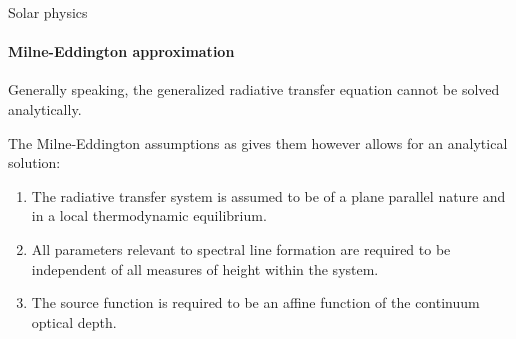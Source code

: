 \documentclass{beamer}
\begin{document}
%
%
%
%

\begin{frame}[allowframebreaks]{Solar physics}
\framesubtitle{Milne-Eddington approximation}
Generally speaking, the generalized radiative transfer equation cannot be solved analytically.

The Milne-Eddington assumptions as \cite[p.411]{DeglInnocenti.2005} gives them however allows for an analytical solution:
\begin{enumerate}
\item The radiative transfer system is assumed to be of a plane parallel nature and in a local thermodynamic equilibrium.
\item All parameters relevant to spectral line formation are required to be independent of all measures of height within the system.
\item The source function is required to be an affine function of the continuum optical depth.
\end{enumerate}
\end{frame}
\end{document}

